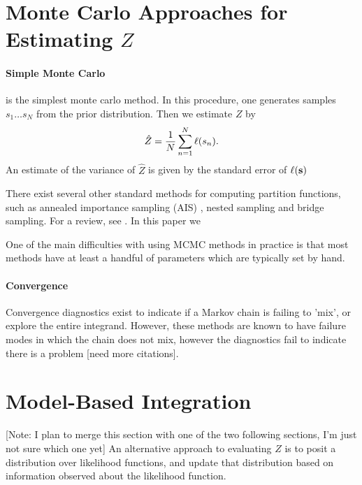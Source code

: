\documentclass{article}
\begin{document}
\section{Monte Carlo Approaches for Estimating $Z$}


\paragraph*{Simple Monte Carlo} is the simplest monte carlo method.  In this procedure, one generates samples $s_1 \dots s_N$ from the prior distribution.  Then we estimate $Z$ by $$\hat{Z} = \frac{1}{N} \sum_{n=1}^{N} \lfn(s_n).$$  An estimate of the variance of $\hat{Z}$ is given by the standard error of $\lfn({\bf s})$


There exist several other standard methods for computing partition functions, such as annealed importance sampling (AIS) \citep{neal2001annealed}, nested sampling\cite{skilling2004nested} and bridge sampling.  For a review, see \cite{chen2000monte}.  In this paper we 

One of the main difficulties with using MCMC methods in practice is that most methods have at least a handful of parameters which are typically set by hand.

\paragraph{Convergence}
Convergence diagnostics exist to indicate if a Markov chain is failing to 'mix', or explore the entire integrand.  However, these methods are known to have failure modes in which the chain does not mix, however the diagnostics fail to indicate there is a problem \citep{NealMC} [need more citations].

\section{Model-Based Integration}

[Note: I plan to merge this section with one of the two following sections, I'm just not sure which one yet] An alternative approach to evaluating $Z$ is to posit a distribution over likelihood functions, and update that distribution based on information observed about the likelihood function.
\end{document}
